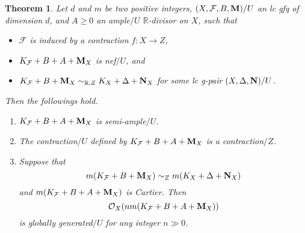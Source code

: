 \documentclass[11pt]{amsart}
\numberwithin{equation}{section}
\newcommand{\Mm}{{\bf{M}}}
\newcommand{\Nn}{{\bf{N}}}
\newcommand{\Rr}{\mathbb{R}}
\newcommand{\Ff}{\mathcal{F}}
\newtheorem{thm}{Theorem}[subsection]
\theoremstyle{definition}
\theoremstyle{definition}
\theoremstyle{definition}
\begin{document}
\begin{thm}\label{thm: bpf induced gfq}
Let $d$ and $m$ be two positive integers, $(X,\Ff,B,\Mm)/U$ an lc gfq of dimension $d$, and $A\geq 0$ an ample$/U$ $\Rr$-divisor on $X$, such that
\begin{itemize}
  \item $\Ff$ is induced by a contraction $f: X\rightarrow Z$, 
  \item $K_{\Ff}+B+A+\Mm_X$ is nef$/U$, and
  \item $K_{\Ff}+B+\Mm_X\sim_{\mathbb R,Z}K_X+\Delta+\Nn_X$ for some lc g-pair $(X,\Delta,\Nn)/U$.
\end{itemize}
Then the followings hold.
\begin{enumerate}
  \item  $K_{\Ff}+B+A+\Mm_X$ is semi-ample$/U$.
  \item  The contraction$/U$ defined by $K_{\Ff}+B+A+\Mm_X$ is a contraction$/Z$.
  \item Suppose that 
  $$m(K_{\Ff}+B+\Mm_X)\sim_{Z}m(K_X+\Delta+\Nn_X)$$ 
  and $m(K_{\Ff}+B+A+\Mm_X)$ is Cartier. Then $$\mathcal{O}_X(nm(K_{\Ff}+B+A+\Mm_X))$$ is globally generated$/U$ for any integer $n\gg 0$.
\end{enumerate}
\end{thm}
\end{document}
